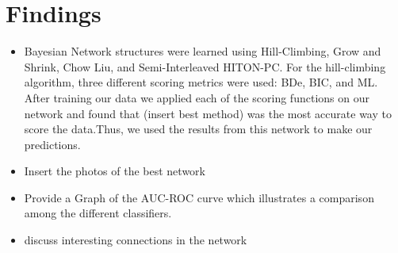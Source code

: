 \section{Findings}
\begin{itemize}
    \item Bayesian Network structures were learned using Hill-Climbing, Grow and Shrink, Chow Liu, and Semi-Interleaved HITON-PC. For the hill-climbing algorithm, three different scoring metrics were used: BDe, BIC, and ML. After training our data we applied each of the scoring functions on our network and found that (insert best method) was the most accurate way to score the data.Thus, we used the results from this network to make our predictions. 
    \item Insert the photos of the best network 
    \item Provide a Graph of the AUC-ROC curve which illustrates a comparison among the different classifiers.
    \item discuss interesting connections in the network
\end{itemize}

